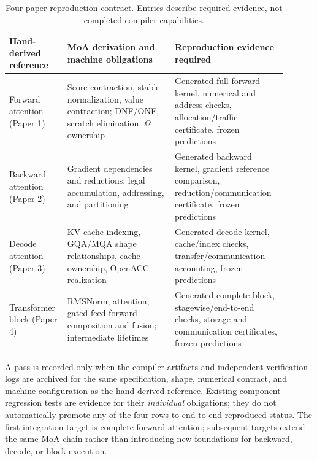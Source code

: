 \documentclass[11pt]{article}
\begin{document}
\begin{table}[htbp]\centering\small
\caption{Four-paper reproduction contract. Entries describe required evidence, not completed compiler capabilities.}\label{tab:fourpapercontract}
\begin{tabular}{p{0.18\linewidth}p{0.36\linewidth}p{0.36\linewidth}}\toprule
Hand-derived reference & MoA derivation and machine obligations & Reproduction evidence required \\\midrule
Forward attention (Paper 1) & Score contraction, stable normalization, value contraction; DNF/ONF, scratch elimination, $\Omega$ ownership & Generated full forward kernel, numerical and address checks, allocation/traffic certificate, frozen predictions \\
Backward attention (Paper 2) & Gradient dependencies and reductions; legal accumulation, addressing, and partitioning & Generated backward kernel, gradient reference comparison, reduction/communication certificate, frozen predictions \\
Decode attention (Paper 3) & KV-cache indexing, GQA/MQA shape relationships, cache ownership, OpenACC realization & Generated decode kernel, cache/index checks, transfer/communication accounting, frozen predictions \\
Transformer block (Paper 4) & RMSNorm, attention, gated feed-forward composition and fusion; intermediate lifetimes & Generated complete block, stagewise/end-to-end checks, storage and communication certificates, frozen predictions \\\bottomrule
\end{tabular}
\end{table}

A pass is recorded only when the compiler artifacts and independent verification logs are archived for the same specification, shape, numerical contract, and machine configuration as the hand-derived reference. Existing component regression tests are evidence for their \emph{individual} obligations; they do not automatically promote any of the four rows to end-to-end reproduced status. The first integration target is complete forward attention; subsequent targets extend the same MoA chain rather than introducing new foundations for backward, decode, or block execution.
\end{document}
